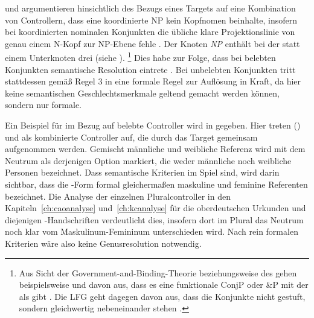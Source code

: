 \citet[182--183]{wechslerzlatic2003} und \citet[576]{wechsler2009}
argumentieren hinsichtlich des Bezugs eines Targets auf eine
Kombination von Controllern, dass eine koordinierte NP kein
Kopf\-nomen beinhalte, insofern bei koordinierten
nominalen Konjunkten die übliche klare Projektionslinie von genau einem N-Kopf
zur NP-Ebene fehle \autocites[183, Fußnote 85]{wechslerzlatic2003}[585, Fußnote
7]{wechsler2009}. Der Knoten \emph{NP} enthält bei der  statt
einem Unterknoten drei (siehe ).%
%
	\footnote{Aus Sicht der Government-and-Binding-Theorie beziehungsweise des  gehen beispielsweise
	\textcites{johannessen1998}{johannessen2005} und \citet{shen2019} davon
	aus, dass es eine funktionale ConjP oder \&P mit der  als
	 gibt \autocite[dagegen aber][]{borsley2005}. Die
	LFG geht dagegen davon aus, dass die
	Konjunkte nicht gestuft, sondern gleichwertig nebeneinander stehen
	\autocites[vgl.~z.\,B.][]{peterson2004}{sadlernordlinger2006}.}
%
Dies habe zur Folge, dass bei belebten Konjunkten semantische Resolution
eintrete \autocites[183]{wechslerzlatic2003}[576]{wechsler2009}. Bei
unbelebten Konjunkten tritt stattdessen gemäß Regel 3 in
 eine formale Regel zur Auflösung in
Kraft, da hier keine semantischen
Geschlechtsmerkmale geltend gemacht
werden können, sondern nur formale.

Ein Beispiel für  im Bezug auf belebte Controller wird in
 gegeben. Hier treten  (\MascM) und
  als kombinierte Controller
auf, die durch das Target  
gemeinsam aufgenommen werden. Gemischt männliche und weibliche Referenz wird
mit dem Neutrum als derjenigen Option markiert, die weder männliche noch
weibliche Personen bezeichnet. Dass semantische Kriterien im Spiel sind, wird
darin sichtbar, dass die -Form formal gleichermaßen maskuline und
feminine Referenten bezeichnet. Die Analyse der einzelnen Pluralcontroller in
den Kapiteln~\ref{ch:caoanalyse} und~\ref{ch:kcanalyse} für die
oberdeutschen Urkunden und diejenigen \KC{}-Handschriften
verdeutlicht dies, insofern dort im Plural das Neutrum noch klar vom
Masku\-li\-num-Femi\-ninum unterschieden wird. Nach rein formalen Kriterien
wäre also keine Genusresolution notwendig.

